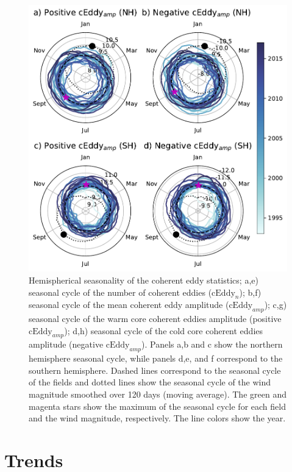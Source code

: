 \documentclass[draft,linenumbers]{agujournal2019}
\newcommand{\cEddy}{\textrm{cEddy}}
\begin{document}
	\begin{figure}
	    \centering
	    \includegraphics[width=1\textwidth]{figures/All_polar_plots_eddy_stats_polarity_V2.pdf}
	    \caption{Hemispherical seasonality of the coherent eddy statistics;
		a,e) seasonal cycle of the number of coherent eddies ($\cEddy_n$); b,f) seasonal cycle of the mean coherent eddy amplitude ($\cEddy_{amp}$); c,g) seasonal cycle of the warm core coherent eddies amplitude (positive $\cEddy_{amp}$); d,h) seasonal cycle of the cold core coherent eddies amplitude (negative $\cEddy_{amp}$). Panels a,b and c show the northern hemisphere seasonal cycle, while panels d,e, and f correspond to the southern hemisphere. Dashed lines correspond to the seasonal cycle of the fields and dotted lines show the seasonal cycle of the wind magnitude smoothed over 120 days (moving average). The green and magenta stars show the maximum of the seasonal cycle for each field and the wind magnitude, respectively. The line colors show the year.}
	    \label{fig:eddy_stats_polar}
	\end{figure}

	\section{Trends}
	\label{sec:CE_trends}
\end{document}
